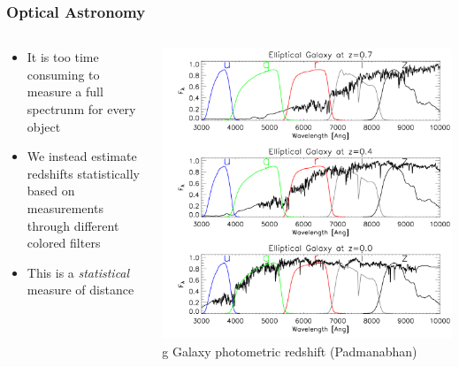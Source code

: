 \documentclass{beamer}
\begin{document}
\frame
{

    \frametitle{Optical Astronomy}


    \begin{columns}
        \begin{column}{0.4\textwidth}
            \begin{itemize}

                \item It is too time consuming to measure a full spectrunm
                    for every object

                \item We instead estimate redshifts statistically based on
                    measurements through different colored filters

                \item This is a {\em statistical} measure of distance

            \end{itemize}
        \end{column}
        \begin{column}{0.6\textwidth}
            \begin{center}
                \includegraphics[width=\textwidth]{lrg_spectrum.png}
g               \newline
                {\tiny Galaxy photometric redshift (Padmanabhan)}
            \end{center}

            
        \end{column}
    \end{columns}


}
\end{document}
